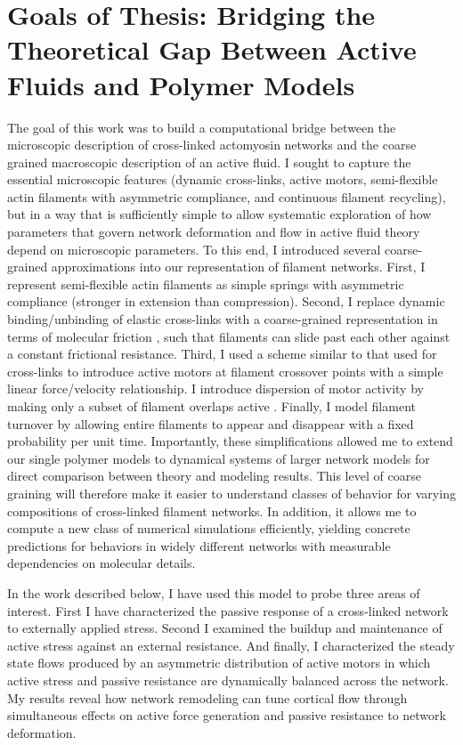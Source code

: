 \section{Goals of Thesis: Bridging the Theoretical Gap Between Active Fluids and Polymer Models}
The goal of this work  was to build a computational bridge between the microscopic description of cross-linked actomyosin networks and the coarse grained macroscopic description of an active fluid.  I sought to capture the essential microscopic features (dynamic cross-links, active motors, semi-flexible actin filaments with asymmetric compliance, and continuous filament recycling), but in a way that is sufficiently simple to allow systematic exploration of how parameters that govern network deformation and flow in active fluid theory depend on microscopic parameters. To this end, I introduced several coarse-grained approximations into our representation of filament networks. First, I represent semi-flexible actin filaments as simple springs with asymmetric compliance (stronger in extension than compression). Second, I replace  dynamic binding/unbinding of elastic cross-links with a coarse-grained representation in terms of molecular friction \cite{theo_friction,theo_frictionSam,theo_molefric}, such that filaments can slide past each other against a constant frictional resistance. Third, I used a scheme similar to that used for cross-links to introduce active motors at filament crossover points with a simple linear force/velocity relationship.  I introduce dispersion of motor activity by making only a subset of filament overlaps active \cite{theo_frictionShila}.  Finally, I model filament turnover by allowing entire filaments to appear and disappear with a fixed probability per unit time. Importantly, these simplifications allowed me to extend our single polymer models to dynamical systems of larger network models for direct comparison between theory and modeling results. This level of coarse graining will therefore make it easier to understand classes of behavior for varying compositions of cross-linked filament networks. In addition, it allows me to compute a new class of numerical simulations efficiently, yielding concrete predictions for behaviors in widely different networks with measurable dependencies on molecular details.

In the work described below, I have used this model to probe three areas of interest. First I have  characterized the passive response of a cross-linked network to externally applied stress. Second I examined the buildup and maintenance of active stress against an external resistance. And finally, I characterized the steady state flows produced by an asymmetric distribution of active motors in which active stress and passive resistance are dynamically balanced across the network.  My results reveal how network remodeling can tune cortical flow through simultaneous effects on active force generation and passive resistance to network deformation.



